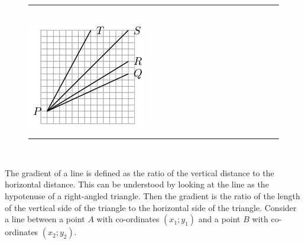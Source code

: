 	\begin{figure}[H] %
    \begin{center}
    \rule[.1in]{\figurerulewidth}{.005in} \\
        \label{m39108*uid41!!!underscore!!!media}\label{m39108*uid41!!!underscore!!!printimage}\includegraphics{col11306.imgs/m39108_MG10C14_017.png} %
        
      \vspace{2pt}
    \vspace{.1in}
    \rule[.1in]{\figurerulewidth}{.005in} \\
        
    \end{center}

 \end{figure}   

    \addtocounter{footnote}{-0}
    
        \label{m39108*id68057}The gradient of a line is defined as the ratio of the vertical distance to the horizontal distance. This can be understood by looking at the line as the hypotenuse of a right-angled triangle. Then the gradient is the ratio of the length of the vertical side of the triangle to the horizontal side of the triangle. Consider a line between a point \begin{math}A\end{math} with co-ordinates \begin{math}\left({x}_{1};{y}_{1}\right)\end{math} and a point \begin{math}B\end{math} with co-ordinates \begin{math}\left({x}_{2};{y}_{2}\right)\end{math}.\par 
        
    \setcounter{subfigure}{0}


